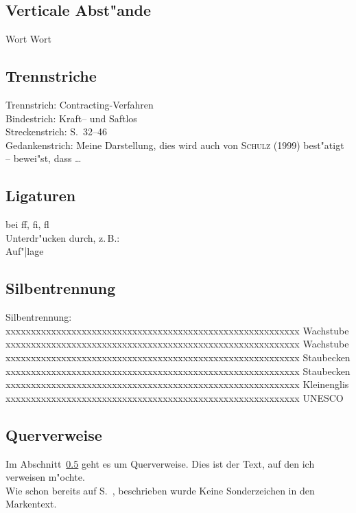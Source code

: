 \documentclass[a4paper,12pt,titlepage]{article} %
\begin{document}
\subsection{Verticale Abst"ande}
Wort
\vspace{1ex}
Wort

\subsection{Trennstriche}
Trennstrich: Contracting-Verfahren\\
Bindestrich: Kraft-- und Saftlos\\
Streckenstrich: S.~32--46\\
Gedankenstrich: Meine Darstellung, dies wird auch von \textsc{Schulz} (1999) best"atigt -- bewei"st, dass \ldots

\subsection{Ligaturen}
bei \glqq ff\grqq, \glqq fi\grqq, \glqq fl\grqq \\
Unterdr"ucken durch, z.\,B.: \\
\glqq Auf"|lage\grqq

\subsection{Silbentrennung}
Silbentrennung:\\
xxxxxxxxxxxxxxxxxxxxxxxxxxxxxxxxxxxxxxxxxxxxxxxxxxxxxxxxxx
Wach\-stube\\
xxxxxxxxxxxxxxxxxxxxxxxxxxxxxxxxxxxxxxxxxxxxxxxxxxxxxxxxxx
Wachs\-tube\\
xxxxxxxxxxxxxxxxxxxxxxxxxxxxxxxxxxxxxxxxxxxxxxxxxxxxxxxxxx
Stau\-becken\\
xxxxxxxxxxxxxxxxxxxxxxxxxxxxxxxxxxxxxxxxxxxxxxxxxxxxxxxxxx
Staub\-ecken\\
xxxxxxxxxxxxxxxxxxxxxxxxxxxxxxxxxxxxxxxxxxxxxxxxxxxxxxxxxx
Klein\-eng\-lis\\
xxxxxxxxxxxxxxxxxxxxxxxxxxxxxxxxxxxxxxxxxxxxxxxxxxxxxxxxxx
\mbox{UNESCO}\\

\subsection{Querverweise}\label{Querverweise}
Im Abschnitt~\ref{Querverweise} geht es um Querverweise.
Dies ist der Text, auf den ich verweisen\label{marke S.117} m"ochte.\\
Wie schon bereits auf S.~\pageref{marke S.117}, beschrieben wurde
Keine Sonderzeichen in den Markentext.
\end{document}
